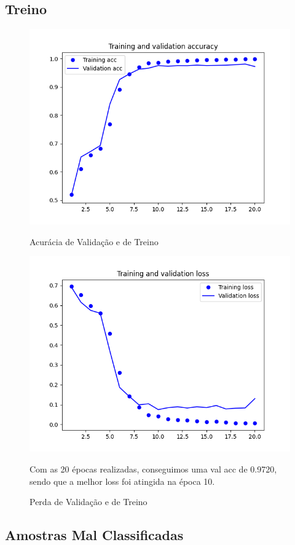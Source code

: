 \subsection{Treino}
\begin{figure}[H]
    \centering
    \includegraphics[width=\textwidth]{imgs/Test_7/7_2/train_test_acc.png}
    \caption{Acurácia de Validação e de Treino}
    \includegraphics[width=\textwidth]{imgs/Test_7/7_2/train_test_loss.png}
    \caption{Perda de Validação e de Treino}
    \label{fig:sub2}
    Com as 20 épocas realizadas, conseguimos uma val acc de 0.9720, sendo que a melhor loss foi atingida na época 10.
\end{figure}

\subsection{Amostras Mal Classificadas}

